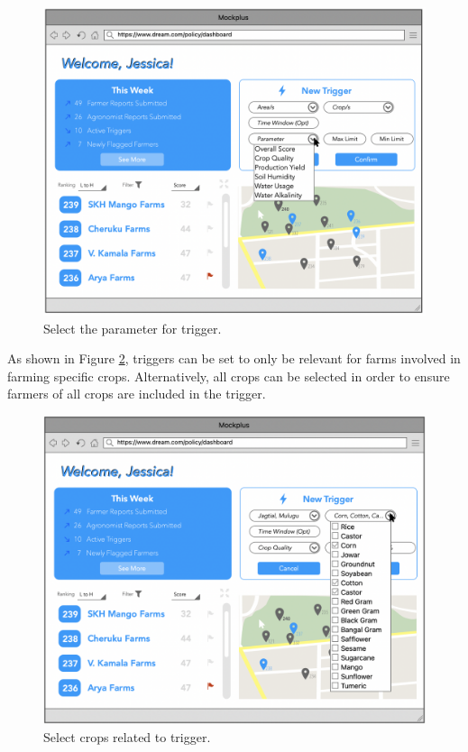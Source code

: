 \begin{figure}[H]
\centering
\includegraphics[scale=0.4]{../images_diagrams/mock_ups/dd/Trig03_Parameters.png}
\caption{\label{fig:mockpolicy_selParam}Select the parameter for trigger.}
\end{figure}


\begin{flushleft}
As shown in Figure \ref{fig:mockpolicy_selCrops}, triggers can be set to only be relevant for farms involved in farming specific crops. Alternatively, all crops can be selected in order to ensure farmers of all crops are included in the trigger. 
\end{flushleft}

\begin{figure}[H]
\centering
\includegraphics[scale=0.4]{../images_diagrams/mock_ups/dd/Trig04_Crops.png}
\caption{\label{fig:mockpolicy_selCrops}Select crops related to trigger.}
\end{figure}

